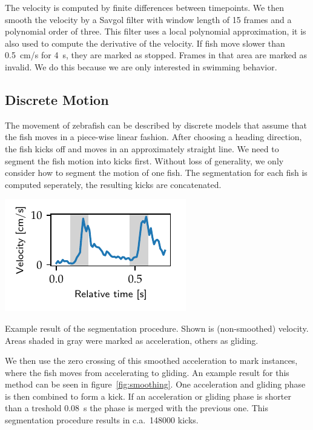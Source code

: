 \documentclass[nobib, a4paper]{tufte-handout}
\begin{document}
The velocity is computed by finite differences between timepoints.
We then smooth the velocity by a Savgol filter with window length of 15 frames and a polynomial order of three.
This filter uses a local polynomial approximation, it is also used to compute the derivative of the velocity.
If fish move slower than \SI{0.5}{\cm/\s} for \SI{4}{\s}, they are marked as stopped.
Frames in that area are marked as invalid.
We do this because we are only interested in swimming behavior.

\subsection{Discrete Motion}
The movement of zebrafish can be described by discrete models that assume that the fish moves in a piece-wise linear fashion.
After choosing a heading direction, the fish kicks off and moves in an approximately straight line.
We need to segment the fish motion into kicks first.
Without loss of generality, we only consider how to segment the motion of one fish.
The segmentation for each fish is computed seperately, the resulting kicks are concatenated.

\begin{marginfigure}
\includegraphics[scale=1]{smoothing}
\caption{Example result of the segmentation procedure.
  Shown is (non-smoothed) velocity.
  Areas shaded in gray were marked as acceleration, others as gliding.
\label{fig:smoothing}}
\end{marginfigure}

We then use the zero crossing of this smoothed acceleration to mark instances, where the fish moves from accelerating to gliding.
An example result for this method can be seen in figure~\ref{fig:smoothing}.
One acceleration and gliding phase is then combined to form a kick.
If an acceleration or gliding phase is shorter than a treshold \SI{0.08}{\s} the phase is merged with the previous one.
This segmentation procedure results in c.a.\ 148000 kicks.
\end{document}

